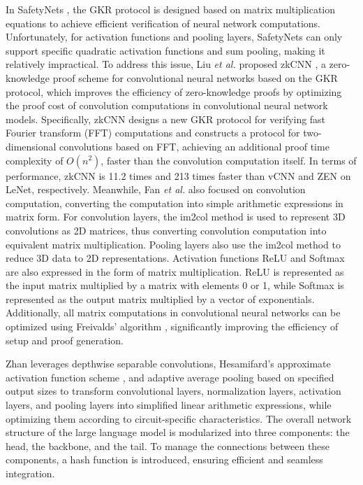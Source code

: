\documentclass[journal]{IEEEtran}
\begin{document}
In SafetyNets \cite{ghodsi2017safetynets}, the GKR protocol is designed based on matrix multiplication equations to achieve efficient verification of neural network computations. Unfortunately, for activation functions and pooling layers, SafetyNets \cite{ghodsi2017safetynets} can only support specific quadratic activation functions and sum pooling, making it relatively impractical. To address this issue, Liu \emph{et al.} proposed zkCNN \cite{liu2021zkcnn}, a zero-knowledge proof scheme for convolutional neural networks based on the GKR protocol, which improves the efficiency of zero-knowledge proofs by optimizing the proof cost of convolution computations in convolutional neural network models. Specifically, zkCNN \cite{liu2021zkcnn} designs a new GKR protocol for verifying fast Fourier transform (FFT) computations and constructs a protocol for two-dimensional convolutions based on FFT, achieving an additional proof time complexity of \(O(n^2)\), faster than the convolution computation itself. In terms of performance, zkCNN is 11.2 times and 213 times faster than vCNN and ZEN on LeNet, respectively. Meanwhile, Fan \cite{fan2023validating}  \emph{et al.} also focused on convolution computation, converting the computation into simple arithmetic expressions in matrix form. For convolution layers, the im2col method is used to represent 3D convolutions as 2D matrices, thus converting convolution computation into equivalent matrix multiplication. Pooling layers also use the im2col method to reduce 3D data to 2D representations. Activation functions ReLU and Softmax are also expressed in the form of matrix multiplication. ReLU is represented as the input matrix multiplied by a matrix with elements 0 or 1, while Softmax is represented as the output matrix multiplied by a vector of exponentials. Additionally, all matrix computations in convolutional neural networks can be optimized using Freivalds' algorithm \cite{freivalds1977probabilistic}, significantly improving the efficiency of setup and proof generation.


Zhan \cite{zhan2024validating} leverages depthwise separable convolutions, Hesamifard's approximate activation function scheme \cite{hesamifard2019deep}, and adaptive average pooling based on specified output sizes to transform convolutional layers, normalization layers, activation layers, and pooling layers into simplified linear arithmetic expressions, while optimizing them according to circuit-specific characteristics. The overall network structure of the large language model is modularized into three components: the head, the backbone, and the tail. To manage the connections between these components, a hash function is introduced, ensuring efficient and seamless integration.
\end{document}
